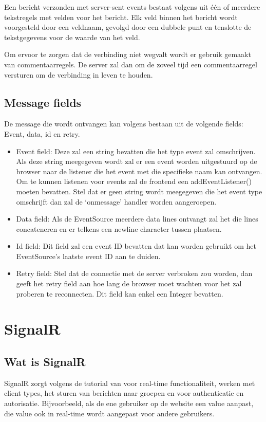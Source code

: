 Een bericht verzonden met server-sent events bestaat volgens \textcite{DevMozSSE} uit één of meerdere tekstregels met velden voor het bericht. Elk veld binnen het bericht wordt voorgesteld door een veldnaam, gevolgd door een dubbele punt en tenslotte de tekstgegevens voor de waarde van het veld.

Om ervoor te zorgen dat de verbinding niet wegvalt wordt er gebruik gemaakt van commentaarregels. De server zal dan om de zoveel tijd een commentaarregel versturen om de verbinding in leven te houden. 

\subsection{Message fields}
De message die wordt ontvangen kan volgens \textcite{DevMozSSE} bestaan uit de volgende fields: Event, data, id en retry.
\begin{itemize}
    \item Event field: Deze zal een string bevatten die het type event zal omschrijven. Als deze string meegegeven wordt zal er een event worden uitgestuurd op de browser naar de listener die het event met die specifieke naam kan ontvangen. Om te kunnen listenen voor events zal de frontend een addEventListener() moeten bevatten. Stel dat er geen string wordt meegegeven die het event type omschrijft dan zal de ‘onmessage’ handler worden aangeroepen.
    \item Data field: Als de EventSource meerdere data lines ontvangt zal het die lines concateneren en er telkens een newline character tussen plaatsen.
    \item Id field: Dit field zal een event ID bevatten dat kan worden gebruikt om het EventSource’s laatste event ID aan te duiden.
    \item Retry field: Stel dat de connectie met de server verbroken zou worden, dan geeft het retry field aan hoe lang de browser moet wachten voor het zal proberen te reconnecten. Dit field kan enkel een Integer bevatten.
\end{itemize}




\section{SignalR}
\subsection{Wat is SignalR}
SignalR zorgt volgens de tutorial van \textcite{PluralsightSignalR} voor real-time functionaliteit, werken met client types, het sturen van berichten naar groepen en voor authenticatie en autorisatie. Bijvoorbeeld, als de ene gebruiker op de website een value aanpast, die value ook in real-time wordt aangepast voor andere gebruikers. 


